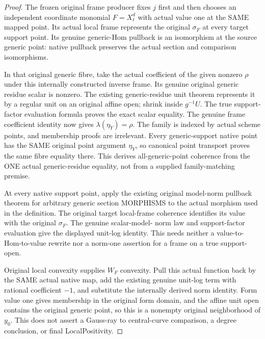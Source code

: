 \begin{proof}
The frozen original frame producer fixes $j$ first and then chooses an
independent coordinate monomial $F=X_\ell^d$ with actual value one at the
SAME mapped point. Its actual local frame represents the original $\sigma_F$
at every target support point. Its genuine generic-Hom pullback is an
isomorphism at the source generic point: native pullback preserves the
actual section and comparison isomorphisms.

In that original generic fibre, take the actual coefficient of the given
nonzero $\rho$ under this internally constructed inverse frame. Its genuine
original generic residue scalar is nonzero. The existing generic-residue
unit theorem represents it by a regular unit on an original affine open;
shrink inside $g^{-1}U$. The true support-factor evaluation formula proves
the exact scalar equality. The genuine frame coefficient identity now gives
$\lambda(\eta_Y)=\rho$. The family is indexed by actual scheme points, and
membership proofs are irrelevant. Every generic-support native point has
the SAME original point argument $\eta_Y$, so canonical point transport
proves the same fibre equality there. This derives all-generic-point
coherence from the ONE actual generic-residue equality, not from a supplied
family-matching premise.

At every native support point, apply the existing original model-norm
pullback theorem for arbitrary generic section MORPHISMS to the actual
morphism used in the definition. The original target local-frame coherence
identifies its value with the original $\sigma_F$. The genuine scalar-model-
norm law and support-factor evaluation give the displayed unit-log identity.
This needs neither a value-to-Hom-to-value rewrite nor a norm-one assertion
for a frame on a true support-open.

Original local convexity supplies $W_F$ convexity. Pull this actual function
back by the SAME actual native map, add the existing genuine unit-log term
with rational coefficient $-1$, and substitute the internally derived norm
identity. Form value one gives membership in the original form domain, and
the affine unit open contains the original generic point, so this is a
nonempty original neighborhood of $y_0$. This does not assert a Gauss-ray to
central-curve comparison, a degree conclusion, or final LocalPositivity.
\end{proof}
